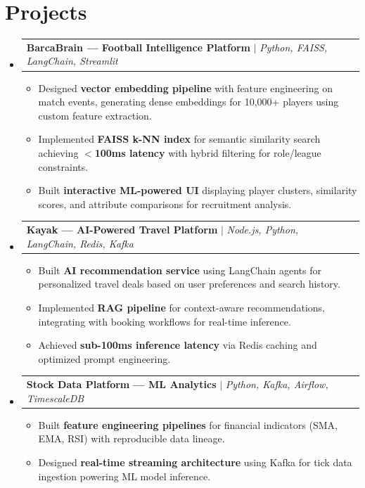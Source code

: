 \documentclass[letterpaper,10pt]{article}
\makeatletter
\newcommand{\resumeItem}[1]{\item\small{#1 \vspace{-3pt}}}
\newcommand{\resumeProjectHeading}[2]{
    \item
    \begin{tabular*}{0.97\textwidth}{l@{\extracolsep{\fill}}r}
      \small#1 & #2 \\
    \end{tabular*}\vspace{-8pt}
}
\newcommand{\resumeSubHeadingListStart}{\begin{itemize}[leftmargin=0.12in, label={}]}
\newcommand{\resumeSubHeadingListEnd}{\end{itemize}}
\newcommand{\resumeItemListStart}{\begin{itemize}[leftmargin=0.15in]}
\newcommand{\resumeItemListEnd}{\end{itemize}\vspace{-6pt}}
\makeatother
\begin{document}
\section{Projects}
    \resumeSubHeadingListStart
      \resumeProjectHeading
          {\textbf{BarcaBrain --- Football Intelligence Platform} $|$ \emph{Python, FAISS, LangChain, Streamlit}}{}
          \resumeItemListStart
            \resumeItem{Designed \textbf{vector embedding pipeline} with feature engineering on match events, generating dense embeddings for 10,000+ players using custom feature extraction.}
            \resumeItem{Implemented \textbf{FAISS k-NN index} for semantic similarity search achieving \textbf{$<$100ms latency} with hybrid filtering for role/league constraints.}
            \resumeItem{Built \textbf{interactive ML-powered UI} displaying player clusters, similarity scores, and attribute comparisons for recruitment analysis.}
          \resumeItemListEnd
      \resumeProjectHeading
          {\textbf{Kayak --- AI-Powered Travel Platform} $|$ \emph{Node.js, Python, LangChain, Redis, Kafka}}{}
          \resumeItemListStart
            \resumeItem{Built \textbf{AI recommendation service} using LangChain agents for personalized travel deals based on user preferences and search history.}
            \resumeItem{Implemented \textbf{RAG pipeline} for context-aware recommendations, integrating with booking workflows for real-time inference.}
            \resumeItem{Achieved \textbf{sub-100ms inference latency} via Redis caching and optimized prompt engineering.}
          \resumeItemListEnd
      \resumeProjectHeading
          {\textbf{Stock Data Platform --- ML Analytics} $|$ \emph{Python, Kafka, Airflow, TimescaleDB}}{}
          \resumeItemListStart
            \resumeItem{Built \textbf{feature engineering pipelines} for financial indicators (SMA, EMA, RSI) with reproducible data lineage.}
            \resumeItem{Designed \textbf{real-time streaming architecture} using Kafka for tick data ingestion powering ML model inference.}
          \resumeItemListEnd
    \resumeSubHeadingListEnd
\end{document}

